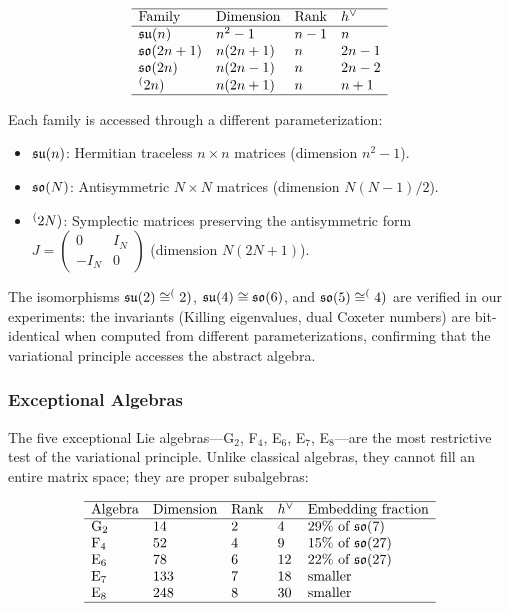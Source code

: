 \begin{equation}
\begin{array}{llll}
\hline
\text{Family} & \text{Dimension} & \text{Rank} & h^\vee \\
\hline
\mathfrak{su}(n) & n^2 - 1 & n - 1 & n \\
\mathfrak{so}(2n+1) & n(2n+1) & n & 2n - 1 \\
\mathfrak{so}(2n) & n(2n-1) & n & 2n - 2 \\
\sp(2n) & n(2n+1) & n & n + 1 \\
\hline
\end{array}
\end{equation}

Each family is accessed through a different parameterization:
\begin{itemize}
\item $\mathfrak{su}(n)$: Hermitian traceless $n \times n$ matrices (dimension $n^2 - 1$).
\item $\mathfrak{so}(N)$: Antisymmetric $N \times N$ matrices (dimension $N(N-1)/2$).
\item $\sp(2N)$: Symplectic matrices preserving the antisymmetric form $J = \begin{pmatrix} 0 & I_N \\ -I_N & 0 \end{pmatrix}$ (dimension $N(2N+1)$).
\end{itemize}

The isomorphisms $\mathfrak{su}(2) \cong \sp(2)$, $\mathfrak{su}(4) \cong \mathfrak{so}(6)$, and $\mathfrak{so}(5) \cong \sp(4)$ are verified in our experiments: the invariants (Killing eigenvalues, dual Coxeter numbers) are bit-identical when computed from different parameterizations, confirming that the variational principle accesses the abstract algebra.

\subsubsection{Exceptional Algebras}

The five exceptional Lie algebras---G$_2$, F$_4$, E$_6$, E$_7$, E$_8$---are the most restrictive test of the variational principle. Unlike classical algebras, they cannot fill an entire matrix space; they are proper subalgebras:

\begin{equation}
\begin{array}{lllll}
\hline
\text{Algebra} & \text{Dimension} & \text{Rank} & h^\vee & \text{Embedding fraction} \\
\hline
\text{G}_2 & 14 & 2 & 4 & 29\%\ \text{of}\ \mathfrak{so}(7) \\
\text{F}_4 & 52 & 4 & 9 & 15\%\ \text{of}\ \mathfrak{so}(27) \\
\text{E}_6 & 78 & 6 & 12 & 22\%\ \text{of}\ \mathfrak{so}(27) \\
\text{E}_7 & 133 & 7 & 18 & \text{smaller} \\
\text{E}_8 & 248 & 8 & 30 & \text{smaller} \\
\hline
\end{array}
\end{equation}


